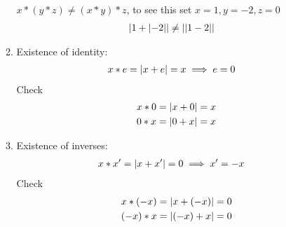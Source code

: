 \documentclass[nohyper,nobib]{tufte-handout}
\theoremstyle{definition}
\theoremstyle{remark}
\begin{document}
\begin{enumerate}
\begin{enumerate}[I]
                $x * (y * z) \neq (x * y) *z$, to see this set $x=1,y=-2,z=0$
                \begin{align}
                    &\abs{1 + \abs{-2}} \neq \abs{\abs{1 - 2}} \nonumber
                \end{align}
            \item Existence of identity:
                \begin{align}
                    &x * e = \abs{x + e} = x \implies e = 0
                \end{align}
                Check
                \begin{align}
                    &x * 0 = \abs{x + 0} = x \nonumber \\
                    &0 * x = \abs{0 + x} = x
                \end{align}
            \item Existence of inverses:
                \begin{align}
                    &x * x' = \abs{x + x'} = 0 \implies x' = -x
                \end{align}
                Check
                \begin{align}
                    &x * (-x) = \abs{x + (-x)} = 0 \nonumber \\
                    &(-x) * x = \abs{(-x) + x} = 0
                \end{align}
        \end{enumerate}
\end{enumerate}
\end{document}
